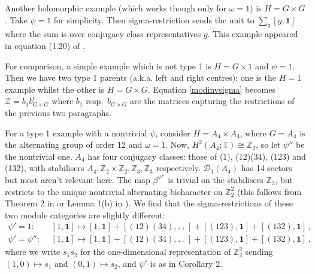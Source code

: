 \documentclass[12pt]{article}
\numberwithin{equation}{section}
\def\cD            {{\mathcal{D}}}
\def\cZ            {{\mathcal{Z}}}
\def\bbT           {\mathbb{T}}
\def\bbZ           {\mathbb{Z}}
\begin{document}
Another holomorphic example (which works though only for $\omega=1$) is $H=G\times G$. Take $\psi=1$  for simplicity. Then  sigma-restriction sends the unit to $\sum_g[g,\mathbf{1}]$ where the sum is over conjugacy class
 representatives $g$. This example appeared in equation (1.20) of \cite{EG2}.
 
For comparison, a simple example which is not type 1 is $H=G\times 1$ and $\psi=1$. Then we have two type 1 parents (a.k.a. left and right centres): one is the $H=1$ example whilst the other is $H=G\times G$. Equation \eqref{modinvsigma} becomes
$\cZ=b_1b_{G\times G}^t$ where $b_1$ resp.\ $b_{G\times G}$ are the matrices capturing the restrictions of the
previous two paragraphs.

For a type 1 example with a nontrivial $\psi$, consider $H=A_4\times A_4$, where $G=A_4$ is the alternating group of order 12 and $\omega=1$. Now, $H^2(A_4;\bbT)\cong \bbZ_2$, so let $\psi''$  be the nontrivial one.  $A_4$ has four conjugacy classes: those of (1), (12)(34), (123) and (132), with stabilisers $A_4,\bbZ_2\times\bbZ_2,\bbZ_3,\bbZ_3$ respectively. $\cD_1(A_4)$ has 14 sectors but most aren't relevant here. The map $\beta^{\psi''}$ is trivial on
the stabilisers $\bbZ_3$, but restricts to the unique nontrivial alternating bicharacter on $\bbZ_2^2$ (this follows from Theorem 2  in \cite{Hugh} or Lemma 1(b) in \cite{EG7}). We find that the sigma-restrictions of these two module categories are
slightly different:
\begin{align}\psi'=1:&\ \ [1,\mathbf{1}]\mapsto [1,\mathbf{1}]+[(12)(34),{}_{^{++}}]+[(123),\mathbf{1}]+[(132),\mathbf{1}]\,,\\
\psi'=\psi'':&\ \ [1,\mathbf{1}]\mapsto[1,\mathbf{1}]+[(12)(34),{}_{^{+-}}]+[(123),\mathbf{1}]+[(132),\mathbf{1}]\,,\end{align}
where we write $s_1s_2$ for the one-dimensional representation of $\bbZ_2^2$ sending
$(1,0)\mapsto s_1$ and $(0,1)\mapsto s_2$, and $\psi'$ is as in Corollary 2.
\end{document}
